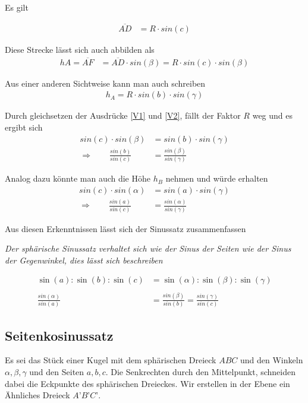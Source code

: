 \begin{refsection}
Es gilt

\begin{align*}
\overline{AD} &= R \cdot sin (c)
\end{align*}

Diese Strecke lässt sich auch abbilden als
\begin{align}
hA = \overline{AF} &= \overline{AD} \cdot sin(\beta) = R \cdot sin(c) \cdot sin(\beta)  
\label {V1}
\end{align}

Aus einer anderen Sichtweise kann man auch schreiben
\begin{align}
h_{A} = R \cdot sin(b) \cdot sin(\gamma)  
\label {V2}
\end{align}

Durch gleichsetzen der Ausdrücke \eqref{V1} und \eqref{V2}, fällt der Faktor $R$ weg und es ergibt sich 
\begin{align*}
sin(c) \cdot sin(\beta) &= sin(b) \cdot sin(\gamma) \\
\Rightarrow \quad \quad
\frac{sin (b)}{sin (c)} &= \frac{sin (\beta)}{sin (\gamma)}
\end{align*}

Analog dazu könnte man auch die Höhe $h_{B}$ nehmen und würde erhalten
\begin{align*}
sin(c) \cdot sin(\alpha) &= sin(a) \cdot sin(\gamma) \\
\Rightarrow \quad \quad
\frac{sin (a)}{sin (c)} &= \frac{sin (\alpha)}{sin (\gamma)}
\end{align*}

Aus diesen Erkenntnissen lässt sich der Sinussatz zusammenfassen
\begin{satz}\textit{Der sphärische Sinussatz verhaltet sich wie der Sinus der Seiten wie der Sinus der Gegenwinkel, dies lässt sich beschreiben}
\label{skript:kugel:satz:Sinussatz}
\end{satz}

\begin{align*}
\sin(a) : \sin(b) : \sin(c) &= \sin(\alpha) : \sin(\beta) : \sin(\gamma) \\
 \\
\frac{sin(\alpha)}{sin(a)} &= \frac{sin(\beta)}{sin(b)} = \frac{sin(\gamma)}{sin(c)}
\end{align*} 


\subsection{Seitenkosinussatz}
Es sei das Stück einer Kugel mit dem sphärischen Dreieck $ABC$ und den Winkeln $\alpha, \beta, \gamma$ und den Seiten $a, b, c$. Die Senkrechten durch den Mittelpunkt, schneiden dabei die Eckpunkte des sphärischen Dreieckes. Wir erstellen in der Ebene ein Ähnliches Dreieck $A’B’C’$.


\end{refsection}
